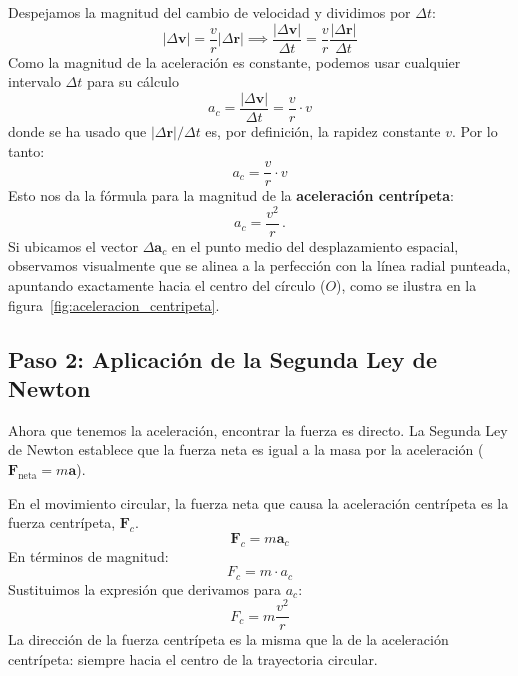\documentclass[11pt,a4paper]{book}
\begin{document}
Despejamos la magnitud del cambio de velocidad y dividimos por $\Delta t$:
\[ |\Delta \boldsymbol{v}| = \frac{v}{r} |\Delta \boldsymbol{r}| \implies \frac{|\Delta \boldsymbol{v}|}{\Delta t} = \frac{v}{r} \frac{|\Delta \boldsymbol{r}|}{\Delta t} \]
Como la magnitud de la aceleración es constante, podemos usar cualquier intervalo $\Delta t$ para su cálculo
\[ 
a_c =  \frac{|\Delta \boldsymbol{v}|}{\Delta t} =\frac{v}{r} \cdot v
\]
donde se ha usado que ${|\Delta \boldsymbol{r}|}/{\Delta t}$ es, por definición, la rapidez constante $v$. Por lo tanto:
\[ a_c = \frac{v}{r} \cdot v \]
Esto nos da la fórmula para la magnitud de la \textbf{aceleración centrípeta}:
\begin{equation}
\label{eq:acentripeta}
    \boxed{a_c = \frac{v^2}{r}}\,.
\end{equation}
Si ubicamos el vector $\Delta\boldsymbol{a}_c$ en el punto medio del desplazamiento espacial, observamos visualmente que se alinea a la perfección con la línea radial punteada, apuntando exactamente hacia el centro del círculo ($O$), como se ilustra en la figura~\ref{fig:aceleracion_centripeta}.

\subsection{Paso 2: Aplicación de la Segunda Ley de Newton}
Ahora que tenemos la aceleración, encontrar la fuerza es directo. La Segunda Ley de Newton establece que la fuerza neta es igual a la masa por la aceleración ($\boldsymbol{F}_{\text{neta}} = m\boldsymbol{a}$).

En el movimiento circular, la fuerza neta que causa la aceleración centrípeta es la fuerza centrípeta, $\boldsymbol{F}_c$.
\[ \boldsymbol{F}_c = m\boldsymbol{a}_c \]
En términos de magnitud:
\[ F_c = m \cdot a_c \]
Sustituimos la expresión que derivamos para $a_c$:
\begin{equation}
    \boxed{ F_c = m \frac{v^2}{r} }
\end{equation}
La dirección de la fuerza centrípeta es la misma que la de la aceleración centrípeta: siempre hacia el centro de la trayectoria circular.



\end{document}
